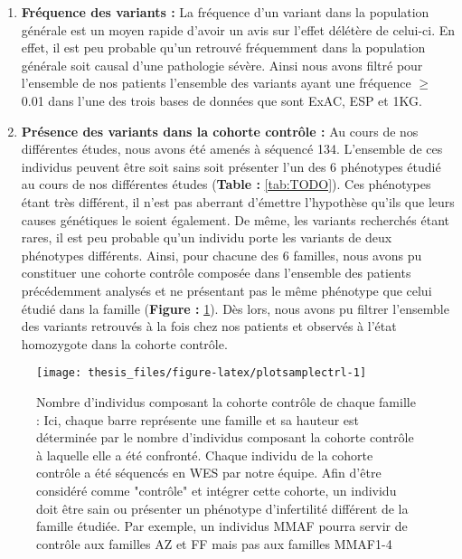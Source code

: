 \documentclass[12pt,twoside]{reedthesis}
\providecommand{\tightlist}{%
  \setlength{\itemsep}{0pt}\setlength{\parskip}{0pt}}
\theoremstyle{definition}
\theoremstyle{definition}
\theoremstyle{remark}
\begin{document}
  \begin{enumerate}
  \def\labelenumi{\arabic{enumi}.}
  \setcounter{enumi}{4}
  \tightlist
  \item
    \textbf{Fréquence des variants :} La fréquence d'un variant dans la
    population générale est un moyen rapide d'avoir un avis sur l'effet
    délétère de celui-ci. En effet, il est peu probable qu'un retrouvé
    fréquemment dans la population générale soit causal d'une pathologie
    sévère. Ainsi nous avons filtré pour l'ensemble de nos patients
    l'ensemble des variants ayant une fréquence \(\ge\) 0.01 dans l'une
    des trois bases de données que sont ExAC, ESP et 1KG.\\
  \item
    \textbf{Présence des variants dans la cohorte contrôle :} Au cours de
    nos différentes études, nous avons été amenés à séquencé 134.
    L'ensemble de ces individus peuvent être soit sains soit présenter
    l'un des 6 phénotypes étudié au cours de nos différentes études
    (\textbf{Table : }\ref{tab:TODO}). Ces phénotypes étant très
    différent, il n'est pas aberrant d'émettre l'hypothèse qu'ils que
    leurs causes génétiques le soient également. De même, les variants
    recherchés étant rares, il est peu probable qu'un individu porte les
    variants de deux phénotypes différents. Ainsi, pour chacune des 6
    familles, nous avons pu constituer une cohorte contrôle composée dans
    l'ensemble des patients précédemment analysés et ne présentant pas le
    même phénotype que celui étudié dans la famille (\textbf{Figure :}
    \ref{fig:plotsamplectrl}). Dès lors, nous avons pu filtrer l'ensemble
    des variants retrouvés à la fois chez nos patients et observés à
    l'état homozygote dans la cohorte contrôle.
  \end{enumerate}
  
  \begin{figure}
  
  {\centering \texttt{[image: thesis\_files/figure-latex/plotsamplectrl-1]} 
  
  }
  
  \caption[Nombre d'individus composant la cohorte contrôle de chaque famille]{Nombre d'individus composant la cohorte contrôle de chaque famille : Ici, chaque barre représente une famille et sa hauteur est déterminée par le nombre d'individus composant la cohorte contrôle à laquelle elle a été confronté. Chaque individu de la cohorte contrôle a été séquencés en WES par notre équipe. Afin d'être considéré comme "contrôle" et intégrer cette cohorte, un individu doit être sain ou présenter un phénotype d'infertilité différent de la famille étudiée. Par exemple, un individus MMAF pourra servir de contrôle aux familles AZ et FF mais pas aux familles MMAF1-4}\label{fig:plotsamplectrl}
  \end{figure}
  
\end{document}
